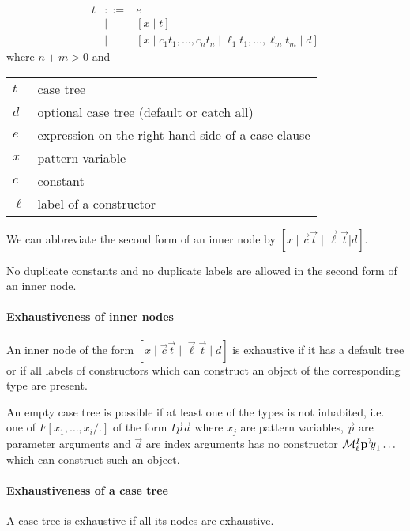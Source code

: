 $$
    \begin{array}{lllll}
        t
        &::=& e
        \\
        &\mid& [x \mid t]
        \\
        &\mid& [
            x
            \mid
            c_1 t_1, \ldots,  c_n t_n \mid
            \ell_1 t_1, \ldots, \ell_m t_m
            \mid
            d
        ]
    \end{array}
$$
%
where $n + m > 0$ and
%
\begin{center}
    \begin{tabular}{l p{8cm}}
        $t$ & case tree
        \\
        $d$ & optional case tree (default or catch all)
        \\
        $e$ & expression on the right hand side of a case clause
        \\
        $x$ & pattern variable
        \\
        $c$ & constant
        \\
        $\ell$ & label of a constructor
    \end{tabular}
\end{center}

We can abbreviate the second form of an inner node by $[x \mid \vec c\vec t \mid
\vec\ell \vec t | d]$.


No duplicate constants and no duplicate labels are allowed in the second form of
an inner node.



\paragraph{Exhaustiveness of inner nodes}
%

An inner node of the form $[x \mid \vec c \vec t \mid \vec\ell \vec t \mid d]$ is
exhaustive if it has a default tree or if all labels of constructors which can
construct an object of the corresponding type are present.

An empty case tree is possible if at least one of the types is not inhabited,
i.e. one of $F[x_1, \ldots, x_i/.]$ of the form $I \vec p \vec a$  where $x_j$
are pattern variables, $\vec p$ are parameter arguments and $\vec a$ are index
arguments has no constructor ${\cal M}^I_\ell {\mathbf p} {{}^? \kern-0.2em y}_1 \ldots$
which can construct such an object.

\paragraph{Exhaustiveness of a case tree}
%
A case tree is exhaustive if all its nodes are exhaustive.





